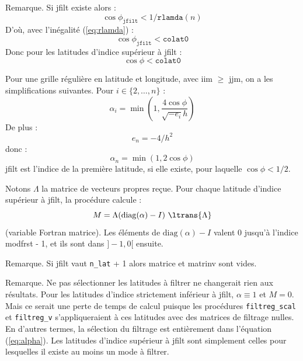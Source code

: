 \documentclass[a4paper,english,french]{article}
\begin{document}
Remarque. Si jfilt existe alors :
\begin{equation*}
  \cos \phi_\mathtt{jfilt} < 1 / \mathtt{rlamda}(n)
\end{equation*}
D'où, avec l'inégalité (\ref{eq:rlamda}) :
\begin{equation*}
  \cos \phi_\mathtt{jfilt} < \mathtt{colat0}
\end{equation*}
Donc pour les latitudes d'indice supérieur à jfilt :
\begin{equation*}
  \cos \phi < \mathtt{colat0}
\end{equation*}

Pour une grille régulière en latitude et longitude, avec iim $\ge$
jjm, on a les simplifications suivantes. Pour $i \in \{2, \dots, n\}$
:
\begin{equation*}
  \alpha_i
  = \min \left(1, \frac{4 \cos \phi}{\sqrt{- e_i} h} \right)
\end{equation*}
De plus :
\begin{equation*}
  e_n = - 4 / h^2
\end{equation*}
donc :
\begin{equation*}
  \alpha_n = \min(1, 2 \cos \phi)
\end{equation*}
jfilt est l'indice de la première latitude, si elle existe, pour
laquelle $\cos \phi < 1 / 2$.

Notons $\Lambda$ la matrice de vecteurs propres reçue. Pour chaque
latitude d'indice supérieur à jfilt, la procédure calcule :
\begin{equation*}
  M = \Lambda (\mathrm{diag}(\alpha) - I)\ \ltrans{\Lambda}
\end{equation*}
(variable Fortran matrice). Les éléments de $\mathrm{diag}(\alpha) -
I$ valent 0 jusqu'à l'indice modfrst - 1, et ils sont dans $]-1, 0[$
ensuite.

Remarque. Si jfilt vaut \verb+n_lat+ + 1 alors matrice et matrinv sont
vides.

Remarque. Ne pas sélectionner les latitudes à filtrer ne changerait
rien aux résultats. Pour les latitudes d'indice strictement inférieur
à jfilt, $\alpha \equiv 1$ et $M = 0$. Mais ce serait une perte de
temps de calcul puisque les procédures \verb+filtreg_scal+ et
\verb+filtreg_v+ s'appliqueraient à ces latitudes avec des matrices de
filtrage nulles. En d'autres termes, la sélection du filtrage est
entièrement dans l'équation (\ref{eq:alpha}). Les latitudes d'indice
supérieur à jfilt sont simplement celles pour lesquelles il existe
au moins un mode à filtrer.
\end{document}
